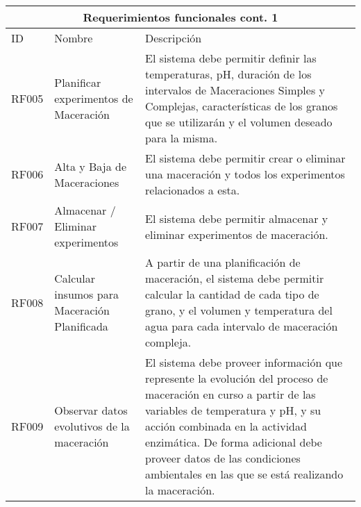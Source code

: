     \begin{minipage}{0.95\textwidth}
    \begin{center}
    \begin{tabularx}{\textwidth}{| X | X | X |}
    \hline
    \multicolumn{3}{|c|}{\textbf{Requerimientos funcionales cont. 1}} \\
    \hline
    ID & Nombre & Descripción \\
    \hline
    \hline
        RF005 &  Planificar experimentos de Maceración & El sistema debe permitir definir las temperaturas, pH, duración de los intervalos de Maceraciones Simples y Complejas, características de los granos que se utilizarán y el volumen deseado para la misma.
        \\\hline
        RF006 & Alta y Baja de Maceraciones & El sistema debe permitir crear o eliminar una maceración y todos los experimentos relacionados a esta.  \\\hline
        RF007 & Almacenar / Eliminar experimentos  & El sistema debe permitir almacenar y eliminar experimentos de maceración.
        \\\hline
        RF008 & Calcular insumos para Maceración Planificada & A partir de una planificación de maceración, el sistema debe permitir calcular la cantidad de cada tipo de grano, y el volumen y temperatura del agua para cada intervalo de maceración compleja.
        \\\hline
        RF009 & Observar datos evolutivos de la maceración & El sistema debe proveer información que represente la evolución del proceso de maceración en curso a partir de las variables de temperatura y pH, y su acción combinada en la actividad enzimática. De forma adicional debe proveer datos de las condiciones ambientales en las que se está realizando la maceración.
        \\\hline
    \end{tabularx}
    \label{ReqFuncionales_Parte2}
    \end{center}
    \end{minipage}
    

